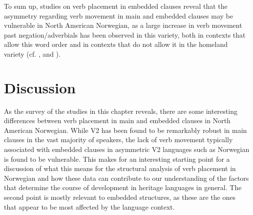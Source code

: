 \documentclass[output=paper]{langscibook}
\begin{document}
To sum up, studies on verb placement in embedded clauses reveal that the asymmetry regarding verb movement in main and embedded clauses may be vulnerable in North American Norwegian, as a large increase in verb movement past negation/adverbials has been observed in this variety, both in contexts that allow this word order and in contexts that do not allow it in the homeland variety (cf. \citealt{Taranrød2011, LarssonJohannessen2015Incomplete, LarssonJohannessen2015Embedded}, and \citealt{JensbergEtAl2024}).

\section{Discussion}%
\label{sec:anderssen:5}

As the survey of the studies in this chapter reveals, there are some interesting differences between verb placement in main and embedded clauses in North American Norwegian. While V2 has been found to be remarkably robust in main clauses in the vast majority of speakers, the lack of verb movement typically associated with embedded clauses in asymmetric V2 languages such as Norwegian is found to be vulnerable. This makes for an interesting starting point for a discussion of what this means for the structural analysis of verb placement in Norwegian and how these data can contribute to our understanding of the factors that determine the course of development in heritage languages in general. The second point is mostly relevant to embedded structures, as these are the ones that appear to be most affected by the language context.  
\end{document}
